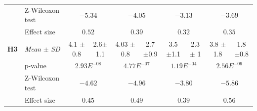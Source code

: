 \documentclass{llncs}
\begin{document}
\begin{table}[t]
{\begin{tabular}{|ll|c|c|c|c|c|c|c|c|}
						\newline & \multicolumn{1}{|l|}{Z-Wilcoxon test} & \multicolumn{2}{c|}{ $-5.34$} & \multicolumn{2}{c|}{ $-4.05$} & \multicolumn{2}{c|}{ $-3.13$}& \multicolumn{2}{c|}{ $-3.69$}\\
						\cline{2-10}	
						\newline & \multicolumn{1}{|l|}{Effect size} & \multicolumn{2}{c|}{ $0.52$} & \multicolumn{2}{c|}{ $0.39$} & \multicolumn{2}{c|}{ $0.32$}& \multicolumn{2}{c|}{ $0.35$}\\
						\hline	
						
						\newline \multirow{4}{*} {\textbf{H3}} &\multicolumn{1}{|l|}{ \textit{Mean} $\pm$ \textit{SD} } & 4.1 $\pm$ 0.8 & 2.6$\pm$ 1.1 & 4.03 $\pm$ 0.8 & 2.7 $\pm$0.9 &3.5 $\pm$1.1 & 2.3$\pm$ 1 & 3.8 $\pm$ 1.8 & 1.8 $\pm$0.8 \\
						\cline{2-10}	
						\newline & \multicolumn{1}{|l|}{p-value}  & \multicolumn{2}{c|}{ $2.93E^{-08}$} & \multicolumn{2}{c|}{ $4.77E^{-07}$} & \multicolumn{2}{c|}{ $1.19E^{-04}$}& \multicolumn{2}{c|}{ $2.56E^{-09}$}\\
						\cline{2-10}	
						\newline & \multicolumn{1}{|l|}{Z-Wilcoxon test} & \multicolumn{2}{c|}{ $-4.62$} & \multicolumn{2}{c|}{ $-4.96$} & \multicolumn{2}{c|}{ $-3.80$}& \multicolumn{2}{c|}{ $-5.86$}\\
						\cline{2-10}	
						\newline & \multicolumn{1}{|l|}{Effect size} & \multicolumn{2}{c|}{ $0.45$} & \multicolumn{2}{c|}{ $0.49$} & \multicolumn{2}{c|}{ $0.39$}& \multicolumn{2}{c|}{ $0.56$}\\
						\hline	
						

\end{tabular}}
\end{table}
\end{document}
